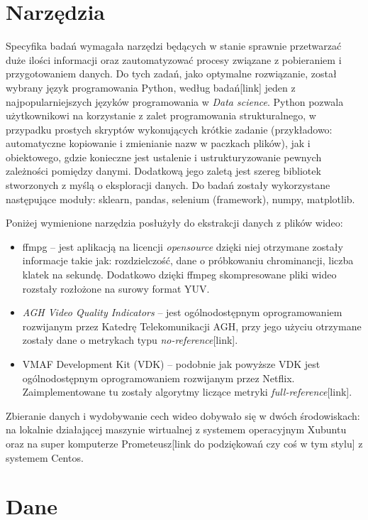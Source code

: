 \section{Narzędzia}
Specyfika badań wymagała narzędzi będących w stanie sprawnie przetwarzać duże ilości informacji oraz zautomatyzować procesy związane z pobieraniem i przygotowaniem danych. Do tych zadań, jako optymalne rozwiązanie, został wybrany język programowania Python, według badań[link] jeden z najpopularniejszych języków programowania w {\em Data science}. Python pozwala użytkownikowi na korzystanie z zalet programowania strukturalnego, w przypadku prostych skryptów wykonujących krótkie zadanie (przykładowo: automatyczne kopiowanie i zmienianie nazw w paczkach plików), jak i obiektowego, gdzie konieczne jest ustalenie i ustrukturyzowanie pewnych zależności pomiędzy danymi. Dodatkową jego zaletą jest szereg bibliotek stworzonych z myślą o eksploracji danych. Do badań zostały wykorzystane następujące moduły: sklearn, pandas, selenium (framework), numpy, matplotlib.\par\par
Poniżej wymienione narzędzia posłużyły do ekstrakcji danych z plików wideo:
\begin{itemize}[label=$\bullet$]
\item ffmpg -- jest aplikacją na licencji {\em opensource} dzięki niej otrzymane zostały informacje takie jak: rozdzielczość, dane o próbkowaniu chrominancji, liczba klatek na sekundę. Dodatkowo dzięki ffmpeg skompresowane pliki wideo rozstały rozłożone na surowy format YUV.
\item {\em AGH Video Quality Indicators} -- jest ogólnodostępnym oprogramowaniem rozwijanym przez Katedrę Telekomunikacji AGH, przy jego użyciu otrzymane zostały dane o metrykach typu {\em no-reference}[link].
\item VMAF Development Kit (VDK) -- podobnie jak powyższe VDK jest ogólnodostępnym oprogramowaniem rozwijanym przez Netflix. Zaimplementowane tu zostały algorytmy liczące metryki {\em full-reference}[link].
\end{itemize}
Zbieranie danych i wydobywanie cech wideo dobywało się w dwóch środowiskach: na lokalnie działającej maszynie wirtualnej z systemem operacyjnym Xubuntu oraz na super komputerze Prometeusz[link do podziękowań czy coś w tym stylu] z systemem Centos. 

\label{cha:drugiDokument}



\section{Dane}
\label{cha:drugiDokument}

